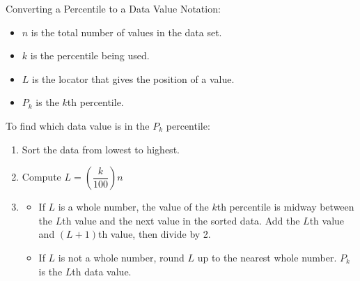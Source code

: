 \documentclass[handout]{beamer}
\begin{document}
\begin{frame}
\begin{block}{Converting a Percentile to a Data Value}
Notation:
\begin{itemize}
\item $n$ is the total number of values in the data set.
\item $k$ is the percentile being used.
\item $L$ is the locator that gives the position of a value.
\item $P_k$ is the $k$th percentile.
\end{itemize}\pause
To find which data value is in the $P_k$ percentile:
\begin{enumerate}
\item Sort the data from lowest to highest.\pause
\item Compute $L=\left(\dfrac{k}{100}\right)n$\pause
\item \begin{itemize}
\item If $L$ is a whole number, the value of the $k$th percentile is midway between the $L$th value and the next value in the sorted data. Add the $L$th value and $(L+1)$th value, then divide by 2.\pause
\item If $L$ is not a whole number, round $L$ up to the nearest whole number. $P_k$is the $L$th data value. 
\end{itemize}
\end{enumerate}
\end{block}
\end{frame}
\end{document}
